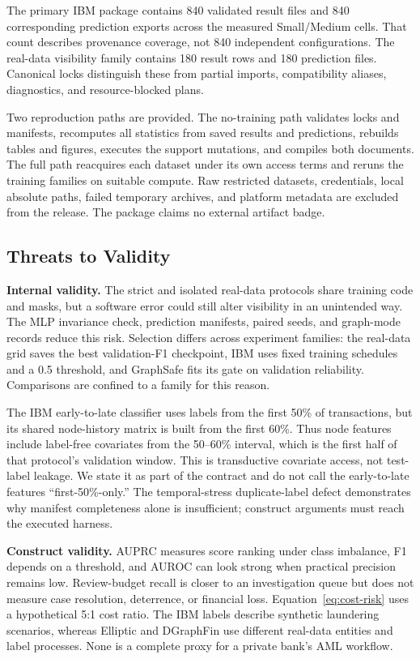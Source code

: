 The primary IBM package contains 840 validated result files and 840 corresponding prediction exports across the measured Small/Medium cells. That count describes provenance coverage, not 840 independent configurations. The real-data visibility family contains 180 result rows and 180 prediction files. Canonical locks distinguish these from partial imports, compatibility aliases, diagnostics, and resource-blocked plans.

Two reproduction paths are provided. The no-training path validates locks and manifests, recomputes all statistics from saved results and predictions, rebuilds tables and figures, executes the support mutations, and compiles both documents. The full path reacquires each dataset under its own access terms and reruns the training families on suitable compute. Raw restricted datasets, credentials, local absolute paths, failed temporary archives, and platform metadata are excluded from the release. The package claims no external artifact badge.

\subsection{Threats to Validity}

\textbf{Internal validity.} The strict and isolated real-data protocols share training code and masks, but a software error could still alter visibility in an unintended way. The MLP invariance check, prediction manifests, paired seeds, and graph-mode records reduce this risk. Selection differs across experiment families: the real-data grid saves the best validation-F1 checkpoint, IBM uses fixed training schedules and a 0.5 threshold, and GraphSafe fits its gate on validation reliability. Comparisons are confined to a family for this reason.

The IBM early-to-late classifier uses labels from the first 50\% of transactions, but its shared node-history matrix is built from the first 60\%. Thus node features include label-free covariates from the 50--60\% interval, which is the first half of that protocol's validation window. This is transductive covariate access, not test-label leakage. We state it as part of the contract and do not call the early-to-late features ``first-50\%-only.'' The temporal-stress duplicate-label defect demonstrates why manifest completeness alone is insufficient; construct arguments must reach the executed harness.

\textbf{Construct validity.} AUPRC measures score ranking under class imbalance, F1 depends on a threshold, and AUROC can look strong when practical precision remains low. Review-budget recall is closer to an investigation queue but does not measure case resolution, deterrence, or financial loss. Equation~\eqref{eq:cost-risk} uses a hypothetical 5:1 cost ratio. The IBM labels describe synthetic laundering scenarios, whereas Elliptic and DGraphFin use different real-data entities and label processes. None is a complete proxy for a private bank's AML workflow.

